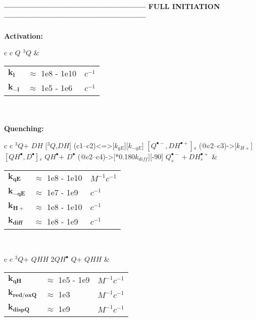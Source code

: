 \documentclass{article}
\def\IRP{$\left[Q^{\bullet -},DH^{\bullet +}\right]{}_s$}
\def\QH{$QH^{\bullet }$}
\def\D{$D^{\bullet }$}
\def\Q{$Q$}
\def\Qt{$^{3}Q$}
\def\DH{$DH$}
\def\QHH{$QHH$}
\begin{document}
\newpage
\textbf{----------------------------------------------------- FULL INITIATION -----------------------------------------------------}
\\
\\

\textbf{Activation:}
\begin{tabular}{ c c }
    \schemestart
    \Q
    \arrow{<=>[$h\nu$, $k_l$][$k_{-l}$]}
    \Qt
    \schemestop
     & \begin{tabular}{ l l l }
           $\mathbf{k_l}$    & $\approx$ 1e8 - 1e10 & $c^{-1}$ \\
           $\mathbf{k_{-l}}$ & $\approx$ 1e5  - 1e6 & $c^{-1}$ \\\hline
       \end{tabular}
    \vspace{1.5mm}
\end{tabular}
\vspace{1.5mm}
\\
\\
\textbf{Quenching:}

\begin{tabular}{ c c }
    \schemestart
    \Qt + \DH
    \arrow{<=>[$k_{diff}$][$k_{dis}$]}
    $[$\Qt,\DH$]$
    \arrow(c1--c2){<=>[$k_{qE}$][$k_{-qE}$]}
    \IRP
    \arrow(@c2--c3){->[$k_{H+}$]}
    $\left[QH^{\bullet},D^{\bullet}\right]{}_s$
    \arrow{->[$k_{diff}$]}
    \QH + \D
    \arrow(@c2--c4){->[*{0.180}$k_{diff}$]}[-90]
    $Q_s^{\bullet -} + DH_s^{\bullet +}$
    \schemestop
     & \begin{tabular}{ l l l }
           $\mathbf{k_{qE}}$   & $\approx$ 1e8 - 1e10 & $M^{-1}c^{-1}$ \\
           $\mathbf{k_{-qE}}$  & $\approx$ 1e7 - 1e9  & $c^{-1}$       \\
           $\mathbf{k_{H+}}$   & $\approx$ 1e8 - 1e10 & $c^{-1}$       \\
           $\mathbf{k_{diff}}$ & $\approx$ 1e8 - 1e9  & $c^{-1}$       \\\hline
       \end{tabular}
    \vspace{1.5mm}
    \\
\end{tabular}
\vspace{1.5mm}

\begin{tabular}{ c c }
    \schemestart
    \Qt + \QHH
    \arrow{->[$k_{qH}$]}
    2\QH
    \Q + \QHH
    \schemestop
     & \begin{tabular}{ l l l }
           $\mathbf{k_{qH}}$      & $\approx$ 1e5 - 1e9 & $M^{-1}c^{-1}$ \\
           $\mathbf{k_{red/oxQ}}$ & $\approx$ 1e3       & $M^{-1}c^{-1}$ \\
           $\mathbf{k_{dispQ}}$   & $\approx$ 1e9       & $M^{-1}c^{-1}$ \\\hline
       \end{tabular}
    \vspace{1.5mm}
\end{tabular}
\vspace{1.5mm}
\end{document}
